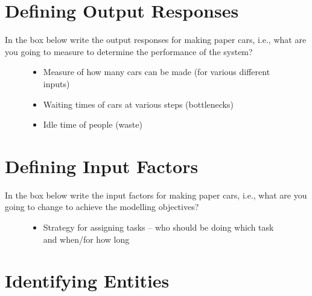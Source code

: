 \documentclass[
  10pt,
  a4paperpaper,
  DIV=11,
  numbers=noendperiod,
  oneside]{scrreprt}
\providecommand{\tightlist}{%
  \setlength{\itemsep}{0pt}\setlength{\parskip}{0pt}}\usepackage{longtable,booktabs,array}
\begin{document}
\section{Defining Output Responses}\label{defining-output-responses-1}

In the box below write the output responses for making paper cars, i.e.,
what are you going to measure to determine the performance of the
system?

\begin{figure}

\begin{mdframed}[innerbottommargin=4.5cm]

\begin{itemize}
\tightlist
\item
  Measure of how many cars can be made (for various different inputs)
\item
  Waiting times of cars at various steps (bottlenecks)
\item
  Idle time of people (waste)
\end{itemize}

\end{mdframed}

\end{figure}%

\newpage{}

\section{Defining Input Factors}\label{defining-input-factors-1}

In the box below write the input factors for making paper cars, i.e.,
what are you going to change to achieve the modelling objectives?

\begin{figure}

\begin{mdframed}[innerbottommargin=4.5cm]

\begin{itemize}
\tightlist
\item
  Strategy for assigning tasks -- who should be doing which task and
  when/for how long
\end{itemize}

\end{mdframed}

\end{figure}%

\section{Identifying Entities}\label{identifying-entities-1}
\end{document}
